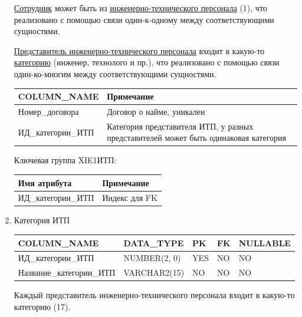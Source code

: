 \begin{enumerate}
\begin{tabular}{|p{4cm}|p{3cm}|p{1cm}|p{1cm}|p{2cm}|}
    \end{tabular}

    \underline{Сотрудник} может быть из \underline{инженерно-технического персонала} (1), что реализовано с помощью связи один-к-одному между соответствующими сущностями.

    \underline{Представитель инженерно-технического персонала} входит в какую-то \underline{категорию} (инженер, технолого и пр.), что реализовано с помощью связи один-ко-многим между соответствующими сущностями.

    \begin{tabular}{|p{4cm}|p{5cm}|} \hline

        {\bf COLUMN\_NAME} & {\bf Примечание} \\ \hline
        Номер\_договора & Договор о найме, уникален \\ \hline
        ИД\_категории\_ИТП & Категория представителя ИТП, у разных представителей может быть одинаковая категория \\ \hline

    \end{tabular}

    Ключевая группа XIE1ИТП:

    \begin{tabular}{|p{4cm}|p{5cm}|} \hline

        {\bf Имя атрибута} & {\bf Примечание} \\ \hline
        ИД\_категории\_ИТП & Индекс для FK \\ \hline

    \end{tabular}

    \item{Категория ИТП}

    \begin{tabular}{|p{4cm}|p{3cm}|p{1cm}|p{1cm}|p{2cm}|} \hline

        {\bf COLUMN\_NAME} & {\bf DATA\_TYPE} & {\bf PK} & {\bf FK} & {\bf NULLABLE} \\ \hline
        ИД\_категории\_ИТП & NUMBER(2, 0) & YES & NO & NO \\ \hline
        Название\_категории\_ИТП & VARCHAR2(15) & NO & NO & NO \\ \hline

    \end{tabular}

    Каждый представитель инженерно-технического персонала входит в какую-то категорию (17).

    \begin{tabular}{|p{4cm}|p{5cm}|} \hline


\end{tabular}
\end{enumerate}
